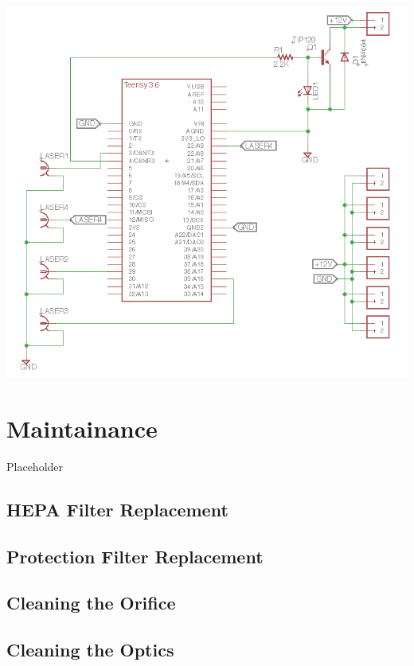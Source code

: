 \documentclass[]{book}
\begin{document}
\begin{center}\includegraphics{./images/electricalSchematic} \end{center}

\chapter{Maintainance}\label{maintainance}

Placeholder

\section{HEPA Filter Replacement}\label{hepa-filter-replacement}

\section{Protection Filter
Replacement}\label{protection-filter-replacement}

\section{Cleaning the Orifice}\label{cleaning-the-orifice}

\section{Cleaning the Optics}\label{cleaning-the-optics}
\end{document}
